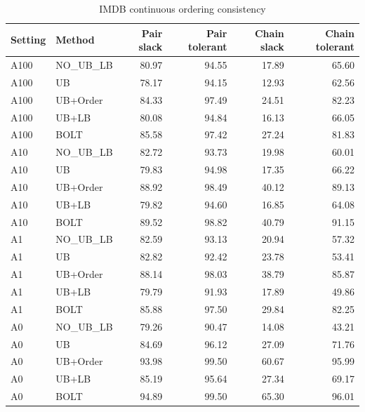 \begin{table}[H]
\centering
\small
\setlength{\tabcolsep}{5pt}
\caption{IMDB continuous ordering consistency}
\label{tab:C_legacy_order_IMDB}
\begin{tabular}{@{}llrrrr@{}}
\toprule
Setting & Method & Pair slack & Pair tolerant & Chain slack & Chain tolerant \\
\midrule
A100 & NO\_UB_LB & 80.97 & 94.55 & 17.89 & 65.60 \\
A100 & UB & 78.17 & 94.15 & 12.93 & 62.56 \\
A100 & UB+Order & 84.33 & 97.49 & 24.51 & 82.23 \\
A100 & UB+LB & 80.08 & 94.84 & 16.13 & 66.05 \\
A100 & BOLT & 85.58 & 97.42 & 27.24 & 81.83 \\
A10 & NO\_UB_LB & 82.72 & 93.73 & 19.98 & 60.01 \\
A10 & UB & 79.83 & 94.98 & 17.35 & 66.22 \\
A10 & UB+Order & 88.92 & 98.49 & 40.12 & 89.13 \\
A10 & UB+LB & 79.82 & 94.60 & 16.85 & 64.08 \\
A10 & BOLT & 89.52 & 98.82 & 40.79 & 91.15 \\
A1 & NO\_UB_LB & 82.59 & 93.13 & 20.94 & 57.32 \\
A1 & UB & 82.82 & 92.42 & 23.78 & 53.41 \\
A1 & UB+Order & 88.14 & 98.03 & 38.79 & 85.87 \\
A1 & UB+LB & 79.79 & 91.93 & 17.89 & 49.86 \\
A1 & BOLT & 85.88 & 97.50 & 29.84 & 82.25 \\
A0 & NO\_UB_LB & 79.26 & 90.47 & 14.08 & 43.21 \\
A0 & UB & 84.69 & 96.12 & 27.09 & 71.76 \\
A0 & UB+Order & 93.98 & 99.50 & 60.67 & 95.99 \\
A0 & UB+LB & 85.19 & 95.64 & 27.34 & 69.17 \\
A0 & BOLT & 94.89 & 99.50 & 65.30 & 96.01 \\
\bottomrule
\end{tabular}
\end{table}
